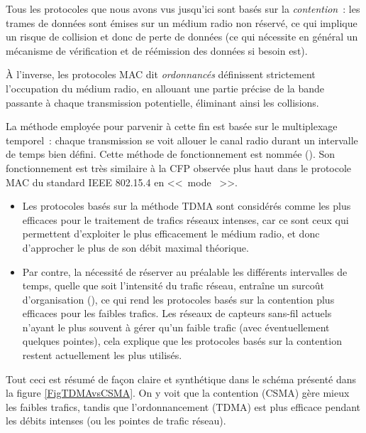 Tous les protocoles que nous avons vus jusqu'ici sont basés sur la
\emph{contention}~: les trames de données sont émises sur un médium radio
non réservé, ce qui implique un risque de collision et donc de perte de
données (ce qui nécessite en général un mécanisme de vérification et de
réémission des données si besoin est).

À l'inverse, les protocoles MAC dit \emph{ordonnancés} définissent
strictement l'occupation du médium radio, en allouant une partie
précise de la bande passante à chaque transmission potentielle, éliminant
ainsi les collisions.

La méthode employée pour parvenir à cette fin est basée sur le multiplexage
temporel~: chaque transmission se voit allouer le canal radio durant un
intervalle de temps bien défini. Cette méthode de fonctionnement est nommée
 (). Son fonctionnement est
très similaire à la CFP observée plus haut dans le protocole MAC du standard
IEEE 802.15.4 en <<~mode ~>>.

\begin{itemize}

\item Les protocoles basés sur la méthode TDMA sont considérés comme les
plus efficaces pour le traitement de trafics réseaux intenses, car ce sont
ceux qui permettent d'exploiter le plus efficacement le médium radio, et
donc d'approcher le plus de son débit maximal théorique.

\item Par contre, la nécessité de réserver au préalable les différents
intervalles de temps, quelle que soit l'intensité du trafic réseau, entraîne
un surcoût d'organisation (), ce qui rend les protocoles
basés sur la contention plus efficaces pour les faibles trafics. Les réseaux
de capteurs sans-fil actuels n'ayant le plus souvent à gérer qu'un faible
trafic (avec éventuellement quelques pointes), cela explique que les
protocoles basés sur la contention restent actuellement les plus utilisés.

\end{itemize}

Tout ceci est résumé de façon claire et synthétique dans le schéma présenté
dans la figure \vref{FigTDMAvsCSMA}. On y voit que la contention (CSMA)
gère mieux les faibles trafics, tandis que l'ordonnancement (TDMA) est plus
efficace pendant les débits intenses (ou les pointes de trafic réseau).

